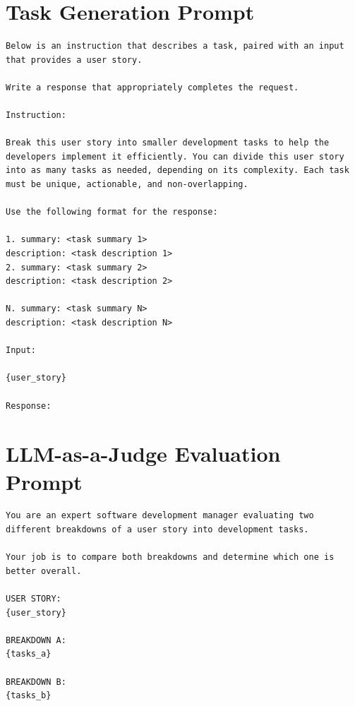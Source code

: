 \documentclass[pdflatex,sn-mathphys-num]{sn-jnl}%
\theoremstyle{thmstyleone}%
\theoremstyle{thmstyletwo}%
\theoremstyle{thmstylethree}%
\begin{document}
\begin{appendices}

\section{Task Generation Prompt}
\label{appendix:task_generation_prompt}

\begin{lstlisting}[basicstyle=\ttfamily\small, breaklines=true, caption={Prompt for Task Generation}, label={lst:task_generation_prompt}]
Below is an instruction that describes a task, paired with an input that provides a user story.

Write a response that appropriately completes the request.

Instruction:

Break this user story into smaller development tasks to help the developers implement it efficiently. You can divide this user story into as many tasks as needed, depending on its complexity. Each task must be unique, actionable, and non-overlapping.

Use the following format for the response:

1. summary: <task summary 1>
description: <task description 1>
2. summary: <task summary 2>
description: <task description 2>

N. summary: <task summary N>
description: <task description N>

Input:

{user_story}

Response:
\end{lstlisting}

\section{LLM-as-a-Judge Evaluation Prompt}
\label{appendix:llm_judge_prompt}

\begin{lstlisting}[basicstyle=\ttfamily\small, breaklines=true, caption={LLM-as-a-Judge Prompt}, label={lst:llm_judge_prompt}]
You are an expert software development manager evaluating two different breakdowns of a user story into development tasks.

Your job is to compare both breakdowns and determine which one is better overall.

USER STORY:
{user_story}

BREAKDOWN A:
{tasks_a}

BREAKDOWN B:
{tasks_b}


\end{lstlisting}
\end{appendices}
\end{document}
